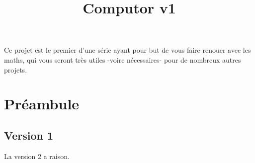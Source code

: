 \documentclass{42}
\begin{document}
\title{Computor v1}
\subtitle{}


\summary
{

Ce projet est le premier d'une série ayant pour but de vous faire renouer avec les maths, qui vous seront très utiles -voire nécessaires- pour de nombreux autres projets.
}

\maketitle

\tableofcontents



\graphicspath{{images/}}

\newpage

\chapter{Préambule}
\section{Version 1}

\hint
{
	La version 2 a raison.
}
\end{document}
